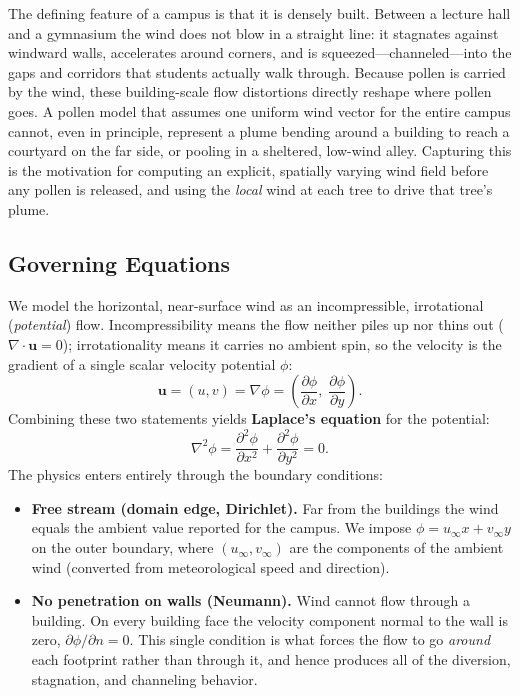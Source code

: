 \documentclass[11pt]{article}
\begin{document}
The defining feature of a campus is that it is densely built. Between a lecture hall and a gymnasium the wind does not blow in a straight line: it stagnates against windward walls, accelerates around corners, and is squeezed---channeled---into the gaps and corridors that students actually walk through. Because pollen is carried by the wind, these building-scale flow distortions directly reshape where pollen goes. A pollen model that assumes one uniform wind vector for the entire campus cannot, even in principle, represent a plume bending around a building to reach a courtyard on the far side, or pooling in a sheltered, low-wind alley. Capturing this is the motivation for computing an explicit, spatially varying wind field before any pollen is released, and using the \emph{local} wind at each tree to drive that tree's plume.

\subsection{Governing Equations}

We model the horizontal, near-surface wind as an incompressible, irrotational (\emph{potential}) flow. Incompressibility means the flow neither piles up nor thins out ($\nabla\!\cdot\!\mathbf{u}=0$); irrotationality means it carries no ambient spin, so the velocity is the gradient of a single scalar velocity potential $\phi$:
\begin{equation}
\mathbf{u} = (u,v) = \nabla \phi = \left(\frac{\partial \phi}{\partial x},\; \frac{\partial \phi}{\partial y}\right).
\label{eq:potential_def}
\end{equation}
Combining these two statements yields \textbf{Laplace's equation} for the potential:
\begin{equation}
\nabla^2 \phi = \frac{\partial^2 \phi}{\partial x^2} + \frac{\partial^2 \phi}{\partial y^2} = 0.
\label{eq:laplace}
\end{equation}
The physics enters entirely through the boundary conditions:
\begin{itemize}
    \item \textbf{Free stream (domain edge, Dirichlet).} Far from the buildings the wind equals the ambient value reported for the campus. We impose $\phi = u_\infty x + v_\infty y$ on the outer boundary, where $(u_\infty, v_\infty)$ are the components of the ambient wind (converted from meteorological speed and direction).
    \item \textbf{No penetration on walls (Neumann).} Wind cannot flow through a building. On every building face the velocity component normal to the wall is zero, $\partial \phi/\partial n = 0$. This single condition is what forces the flow to go \emph{around} each footprint rather than through it, and hence produces all of the diversion, stagnation, and channeling behavior.
\end{itemize}
\end{document}

